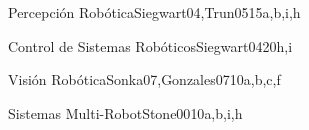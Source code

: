\begin{syllabus}
\begin{unit}{\ISRobotics}{Percepción Robótica}{Siegwart04,Trun05}{15}{a,b,i,h}
\begin{topics}%
	\item \ISRoboticsTopicInterpreting
	\item \ISRoboticsTopicLocalizing
\end{topics}
\begin{learningoutcomes}
	\item \ISRoboticsLOProgram [\Usage]
	\item \ISRoboticsLOImplementFundamental [\Usage]
\end{learningoutcomes}
\end{unit}

\begin{unit}{\ISRobotics}{Control de Sistemas Robóticos}{Siegwart04}{20}{h,i}
\begin{topics}%
	\item \ISRoboticsTopicNavigation
	\item \ISRoboticsTopicMotion
\end{topics}
\begin{learningoutcomes}
	\item \ISRoboticsLOCharacterizeTheWith [\Usage]
	\item \ISRoboticsLOListTheRobots [\Usage]
\end{learningoutcomes}
\end{unit}

\begin{unit}{\ISPerceptionandComputerVision}{Visión Robótica}{Sonka07,Gonzales07}{10}{a,b,c,f}
\begin{topics}%
    \item \ISPerceptionandComputerVisionTopicComputer
    \item \ISPerceptionandComputerVisionTopicModularity
\end{topics}
\begin{learningoutcomes}
    \item \ISPerceptionandComputerVisionLOSummarizeTheImage [\Usage]
    \item \ISPerceptionandComputerVisionLOImplementD [\Usage]
\end{learningoutcomes}
\end{unit}

\begin{unit}{\ISRobotics}{Sistemas Multi-Robot}{Stone00}{10}{a,b,i,h}
\begin{topics}%
    \item \ISRoboticsTopicMultiple
\end{topics}
\begin{learningoutcomes}
    \item \ISRoboticsLOCompareAndLeast [\Familiarity]
    \item \ISRoboticsLODescribeAt [\Familiarity]
\end{learningoutcomes}
\end{unit}

\begin{coursebibliography}
\end{coursebibliography}

\end{syllabus}
